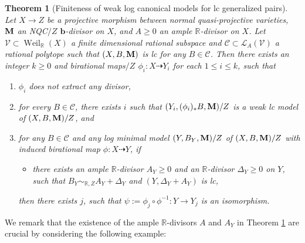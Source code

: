 \documentclass[11pt]{amsart}
\numberwithin{equation}{section}
\newcommand{\bb}{\bm{b}}
\newcommand{\Mm}{{\bf{M}}}
\newcommand{\Rr}{\mathbb{R}}
\newcommand{\Weil}{\operatorname{Weil}}
\newtheorem{thm}{Theorem}[section]
\theoremstyle{definition}
\theoremstyle{definition}
\theoremstyle{definition}
\begin{document}
\begin{thm}[Finiteness of weak log canonical models for lc generalized pairs]\label{thm: finiteness ltm lc gpair}
Let $X\rightarrow Z$ be a projective morphism between normal quasi-projective varieties, $\Mm$ an NQC$/Z$ $\bb$-divisor on $X$, and $A\geq 0$ an ample $\Rr$-divisor on $X$. Let  $\mathcal{V}\subset\Weil_{\Rr}(X)$ a finite dimensional rational subspace and $\mathcal{C}\subset\mathcal{L}_A(\mathcal{V})$ a rational polytope such that $(X,B,\Mm)$ is lc for any $B\in\mathcal{C}$. Then there exists an integer $k\geq 0$ and birational maps$/Z$ $\phi_i: X\dashrightarrow Y_i$ for each $1\leq i\leq k$, such that 
\begin{enumerate}
    \item $\phi_i$ does not extract any divisor, 
    \item for every $B\in\mathcal{C}$, there exists $i$ such that $(Y_i,(\phi_i)_*B,\Mm)/Z$ is a weak lc model of $(X,B,\Mm)/Z$, and
    \item for any $B\in\mathcal{C}$ and any log minimal model $(Y,B_Y,\Mm)/Z$ of $(X,B,\Mm)/Z$ with induced birational map $\phi: X\dashrightarrow Y$, if 
    \begin{itemize}
        \item there exists an ample $\Rr$-divisor $A_Y\geq 0$ and an $\Rr$-divisor $\Delta_Y\geq 0$ on $Y$, such that $B_Y\sim_{\mathbb R,Z}A_Y+\Delta_Y$ and $(Y,\Delta_Y+A_Y)$ is lc,
    \end{itemize}
    then there exists $j$, such that  $\psi:=\phi_j\circ\phi^{-1}: Y\rightarrow Y_j$ is an isomorphism.
\end{enumerate}
\end{thm}

We remark that the existence of the ample $\Rr$-divisors $A$ and $A_Y$ in Theorem \ref{thm: finiteness ltm lc gpair} are crucial by considering the following example:
\end{document}
